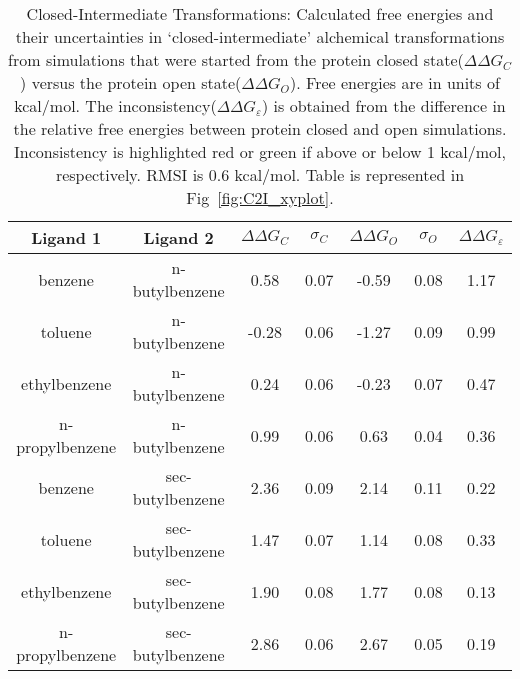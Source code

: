 \begin{table}[!htb]
\centering
\caption{Closed-Intermediate Transformations: 
 Calculated free energies and their uncertainties in `closed-intermediate' alchemical transformations from simulations that were started from the protein closed state(\boldmath$\Delta\Delta G_{C}$) versus the protein open state(\boldmath$\Delta\Delta G_{O}$).
 Free energies are in units of kcal/mol. 
 The inconsistency(\boldmath$\Delta\Delta G_{\varepsilon}$) is obtained from the difference in the relative free energies between protein closed and open simulations. 
 Inconsistency is highlighted red or green if above or below 1 kcal/mol, respectively.
 RMSI is 0.6 kcal/mol.
 Table is represented in Fig~\ref{fig:C2I_xyplot}.
}
\label{tbl:C-I}
\begin{tabular}{|c|c|c|c|c|c|c|}
\hline
\textbf{Ligand 1}   & \textbf{Ligand 2}    & \boldmath$\Delta\Delta G_{C}$ & \boldmath$\sigma_{C}$ & \boldmath$\Delta\Delta G_{O}$ & \boldmath$\sigma_{O}$ & \boldmath$\Delta\Delta G_{\varepsilon}$            \\ \hline
benzene         & n-butylbenzene   & 0.58    & 0.07  & -0.59  & 0.08  & \cellcolor[HTML]{FFCCC9}1.17 \\ \hline
toluene         & n-butylbenzene   & -0.28   & 0.06  & -1.27  & 0.09  & \cellcolor[HTML]{9AFF99}0.99 \\ \hline
ethylbenzene    & n-butylbenzene   & 0.24    & 0.06  & -0.23  & 0.07  & \cellcolor[HTML]{9AFF99}0.47 \\ \hline
n-propylbenzene & n-butylbenzene   & 0.99    & 0.06  & 0.63   & 0.04  & \cellcolor[HTML]{9AFF99}0.36 \\ \hline
benzene         & sec-butylbenzene & 2.36    & 0.09  & 2.14   & 0.11  & \cellcolor[HTML]{9AFF99}0.22 \\ \hline
toluene         & sec-butylbenzene & 1.47    & 0.07  & 1.14   & 0.08  & \cellcolor[HTML]{9AFF99}0.33 \\ \hline
ethylbenzene    & sec-butylbenzene & 1.90    & 0.08  & 1.77   & 0.08  & \cellcolor[HTML]{9AFF99}0.13 \\ \hline
n-propylbenzene & sec-butylbenzene & 2.86    & 0.06  & 2.67   & 0.05  & \cellcolor[HTML]{9AFF99}0.19 \\ \hline
\end{tabular}
\end{table}

